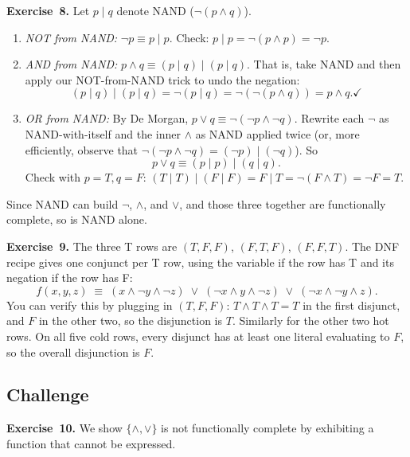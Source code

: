 \documentclass[11pt]{article}
\begin{document}
\medskip
\textbf{Exercise~8.}
Let $p \mid q$ denote NAND ($\lnot(p \wedge q)$).
\begin{enumerate}[label=(\alph*)]
  \item \emph{NOT from NAND:} $\lnot p \equiv p \mid p$. Check: $p \mid p = \lnot(p \wedge p) = \lnot p$. \checkmark
  \item \emph{AND from NAND:} $p \wedge q \equiv (p \mid q) \mid (p \mid q)$. That is, take NAND and then apply our NOT-from-NAND trick to undo the negation:
    \[
      (p \mid q) \mid (p \mid q) = \lnot(p \mid q) = \lnot(\lnot(p \wedge q)) = p \wedge q. \checkmark
    \]
  \item \emph{OR from NAND:} By De Morgan, $p \vee q \equiv \lnot(\lnot p \wedge \lnot q)$. Rewrite each $\lnot$ as NAND-with-itself and the inner $\wedge$ as NAND applied twice (or, more efficiently, observe that $\lnot(\lnot p \wedge \lnot q) = (\lnot p) \mid (\lnot q)$). So
    \[
      p \vee q \equiv (p \mid p) \mid (q \mid q).
    \]
    Check with $p = T, q = F$: $(T \mid T) \mid (F \mid F) = F \mid T = \lnot(F \wedge T) = \lnot F = T$. \checkmark
\end{enumerate}
Since NAND can build $\lnot$, $\wedge$, and $\vee$, and those three together are functionally complete, so is NAND alone.

\medskip
\textbf{Exercise~9.}
The three T rows are $(T,F,F)$, $(F,T,F)$, $(F,F,T)$. The DNF recipe gives one conjunct per T row, using the variable if the row has T and its negation if the row has F:
\[
  f(x, y, z) \;\equiv\; (x \wedge \lnot y \wedge \lnot z) \;\vee\; (\lnot x \wedge y \wedge \lnot z) \;\vee\; (\lnot x \wedge \lnot y \wedge z).
\]
You can verify this by plugging in $(T,F,F)$: $T \wedge T \wedge T = T$ in the first disjunct, and $F$ in the other two, so the disjunction is $T$. Similarly for the other two hot rows. On all five cold rows, every disjunct has at least one literal evaluating to $F$, so the overall disjunction is $F$.

\subsection*{Challenge}

\textbf{Exercise~10.}
We show $\{\wedge, \vee\}$ is not functionally complete by exhibiting a function that cannot be expressed.
\end{document}

